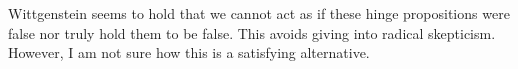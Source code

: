 \documentclass[doc,12pt,apacite,biblatex]{apa6}
\begin{document}
Wittgenstein seems to hold that we cannot act as if these hinge propositions
were false nor truly hold them to be false. This avoids giving into radical
skepticism. However, I am not sure how this is a satisfying alternative.











\end{document}
